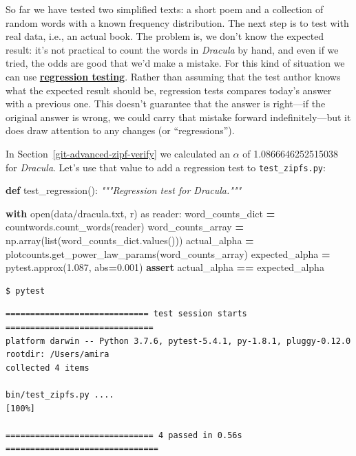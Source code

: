 \documentclass[
]{krantz}
\makeatletter
\newenvironment{Shaded}{\begin{snugshade}}{\end{snugshade}}
\newcommand{\BuiltInTok}[1]{#1}
\newcommand{\CommentTok}[1]{\textcolor[rgb]{0.56,0.35,0.01}{\textit{#1}}}
\newcommand{\ControlFlowTok}[1]{\textcolor[rgb]{0.13,0.29,0.53}{\textbf{#1}}}
\newcommand{\FloatTok}[1]{\textcolor[rgb]{0.00,0.00,0.81}{#1}}
\newcommand{\ImportTok}[1]{#1}
\newcommand{\KeywordTok}[1]{\textcolor[rgb]{0.13,0.29,0.53}{\textbf{#1}}}
\newcommand{\NormalTok}[1]{#1}
\newcommand{\OperatorTok}[1]{\textcolor[rgb]{0.81,0.36,0.00}{\textbf{#1}}}
\newcommand{\StringTok}[1]{\textcolor[rgb]{0.31,0.60,0.02}{#1}}
\newenvironment{kframe}{%
\medskip{}
\setlength{\fboxsep}{.8em}
 \def\at@end@of@kframe{}%
 \ifinner\ifhmode%
  \def\at@end@of@kframe{\end{minipage}}%
  \begin{minipage}{\columnwidth}%
 \fi\fi%
 \def\FrameCommand##1{\hskip\@totalleftmargin \hskip-\fboxsep
 \colorbox{shadecolor}{##1}\hskip-\fboxsep
     \hskip-\linewidth \hskip-\@totalleftmargin \hskip\columnwidth}%
 \MakeFramed {\advance\hsize-\width
   \@totalleftmargin\z@ \linewidth\hsize
   \@setminipage}}%
 {\par\unskip\endMakeFramed%
 \at@end@of@kframe}
\renewenvironment{Shaded}{\begin{kframe}}{\end{kframe}}
\newcommand{\gref}[2]{\hyperlink{#2}{\textbf{#1}}}
\makeatother
\begin{document}
So far we have tested two simplified texts:
a short poem and a collection of random words with a known frequency distribution.
The next step is to test with real data,
i.e., an actual book.
The problem is,
we don't know the expected result:
it's not practical to count the words in \emph{Dracula} by hand,
and even if we tried,
the odds are good that we'd make a mistake.
For this kind of situation we can use
\gref{regression testing}{regression\_testing}.
Rather than assuming that the test author knows what the expected result should be,
regression tests compares today's answer with a previous one.
This doesn't guarantee that the answer is right---if the original answer is wrong,
we could carry that mistake forward indefinitely---but
it does draw attention to any changes (or ``regressions'').

In Section~\ref{git-advanced-zipf-verify}
we calculated an \(\alpha\) of 1.0866646252515038 for \emph{Dracula}.
Let's use that value to add a regression test to \texttt{test\_zipfs.py}:

\begin{Shaded}
\begin{Highlighting}[]
\KeywordTok{def}\NormalTok{ test\_regression():}
    \CommentTok{"""Regression test for Dracula."""}    

    \ControlFlowTok{with} \BuiltInTok{open}\NormalTok{(}\StringTok{\textquotesingle{}data/dracula.txt\textquotesingle{}}\NormalTok{, }\StringTok{\textquotesingle{}r\textquotesingle{}}\NormalTok{) }\ImportTok{as}\NormalTok{ reader:}
\NormalTok{        word\_counts\_dict }\OperatorTok{=}\NormalTok{ countwords.count\_words(reader)}
\NormalTok{    word\_counts\_array }\OperatorTok{=}\NormalTok{ np.array(}\BuiltInTok{list}\NormalTok{(word\_counts\_dict.values()))}
\NormalTok{    actual\_alpha }\OperatorTok{=}\NormalTok{ plotcounts.get\_power\_law\_params(word\_counts\_array)}
\NormalTok{    expected\_alpha }\OperatorTok{=}\NormalTok{ pytest.approx(}\FloatTok{1.087}\NormalTok{, }\BuiltInTok{abs}\OperatorTok{=}\FloatTok{0.001}\NormalTok{)}
    \ControlFlowTok{assert}\NormalTok{ actual\_alpha }\OperatorTok{==}\NormalTok{ expected\_alpha}
\end{Highlighting}
\end{Shaded}

\begin{verbatim}
$ pytest
\end{verbatim}

\begin{verbatim}
============================= test session starts ==============================
platform darwin -- Python 3.7.6, pytest-5.4.1, py-1.8.1, pluggy-0.12.0
rootdir: /Users/amira
collected 4 items                                                                                

bin/test_zipfs.py ....                                                   [100%]

============================== 4 passed in 0.56s ===============================
\end{verbatim}
\end{document}
